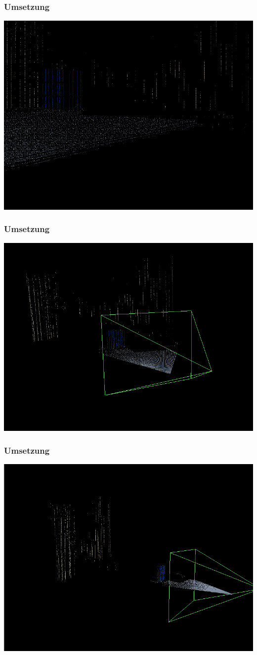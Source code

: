 \documentclass[xcolor=dvipsnames]{beamer}
\begin{document}
\begin{frame}
	\frametitle{Umsetzung}

	\includegraphics[width=0.9\linewidth]{includes/3d_2.png}

\end{frame}
\begin{frame}
	\frametitle{Umsetzung}

	\includegraphics[width=0.9\linewidth]{includes/3d_3.png}

\end{frame}
\begin{frame}
	\frametitle{Umsetzung}

	\includegraphics[width=0.9\linewidth]{includes/3d_4.png}

\end{frame}
\end{document}
